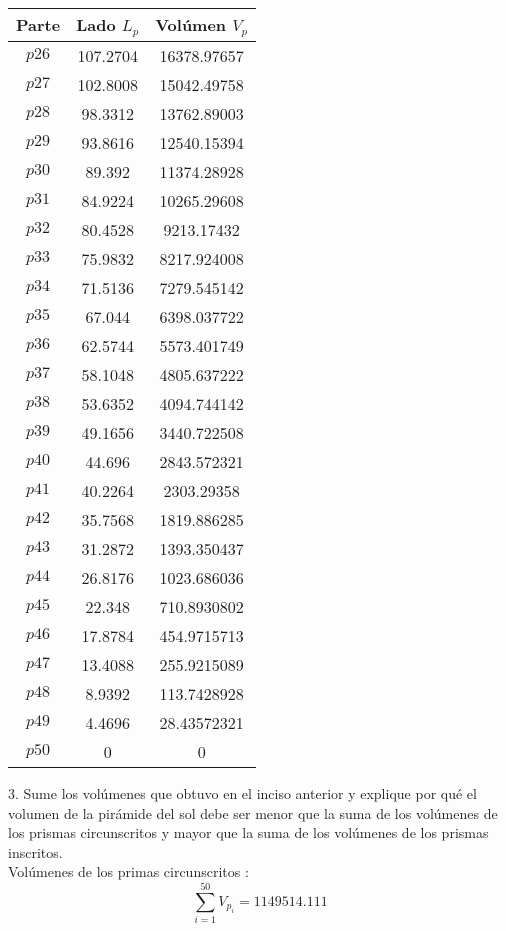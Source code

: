 \documentclass[12pt]{article}
\begin{document}
\begin{multicols}{2}
\begin{tabular}{||c c c||} 
 \hline
 Parte & Lado $L_p$ & Volúmen $V_p$\\ [0.5ex] 
 \hline\hline
$p26$ 	&	107.2704	 &	16378.97657 \\
$p27$	 &	102.8008	 &	15042.49758 \\
$p28$	 &	98.3312	 &	13762.89003 \\
$p29$	 &	93.8616	 &	12540.15394 \\
$p30$	 &	89.392	&	11374.28928 \\
$p31$	 &	84.9224	&	10265.29608  \\
$p32$	 &	80.4528	&	9213.17432 \\
$p33$	 &	75.9832	&	8217.924008  \\
$p34$	 &	71.5136	&	7279.545142 \\
$p35$	 &	67.044	&	6398.037722 \\
$p36$	&	62.5744	&	5573.401749 \\
$p37$	&	58.1048	&	4805.637222 \\
$p38$	&	53.6352	&	4094.744142 \\
$p39$	&	49.1656	&	3440.722508 \\
$p40$	&	44.696	&	2843.572321 \\
$p41$	&	40.2264	&	2303.29358 \\
$p42$	&	35.7568	&	1819.886285 \\
$p43$	&	31.2872	&	1393.350437 \\
$p44$	&	26.8176	&	1023.686036 \\
$p45$	&	22.348	&	710.8930802 \\
$p46$	&	17.8784	&	454.9715713 \\
$p47$	&	13.4088	&	255.9215089 \\
$p48$	&	8.9392	&	113.7428928 \\
$p49$	&	4.4696	&	28.43572321 \\
$p50$	&	0	&	0\\ [1ex] 
\hline
\end{tabular}

\end{multicols}

3. Sume los volúmenes que obtuvo en el inciso anterior y explique por qué el volumen de la
pirámide del sol debe ser menor que la suma de los volúmenes de los prismas circunscritos y mayor que la suma de los volúmenes de los prismas inscritos.\\
Volúmenes de los primas circunscritos : 
\[
\sum_{i=1}^{50} V_{p_i} = 1149514.111 
\]
\end{document}
